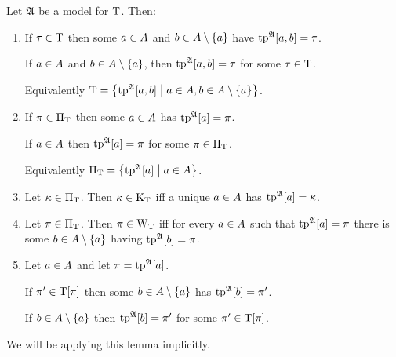 \begin{lemma}\label{rem:type-char}
Let $\mathfrak{A}$ be a model for $\mathrm{T}$.
Then:
\begin{enumerate}
  \item
  If $\tau\in\mathrm{T}$
  then some $a\in A$ and $b\in A\setminus\left\{a\right\}$
  have $\operatorname{tp}^{\mathfrak{A}}[a,b] = \tau$.
  
  If $a\in A$ and $b\in A\setminus\left\{a\right\}$,
  then $\operatorname{tp}^{\mathfrak{A}}[a,b] = \tau$ for some $\tau\in\mathrm{T}$.
  
  Equivalently $\mathrm{T} =
  \left\{\operatorname{tp}^{\mathfrak{A}}[a,b]\mathrel{}\middle|\mathrel{}a\in A,b\in A\setminus\left\{a\right\}\right\}$.
  \item
  If $\pi\in{\Pi}_{\mathrm{T}}$
  then some $a\in A$ has $\operatorname{tp}^{\mathfrak{A}}[a] = \pi$.
  
  If $a\in A$
  then $\operatorname{tp}^{\mathfrak{A}}[a] = \pi$ for some $\pi\in{\Pi}_{\mathrm{T}}$.
  
  Equivalently ${\Pi}_{\mathrm{T}} = \left\{\operatorname{tp}^{\mathfrak{A}}[a]\mathrel{}\middle|\mathrel{}a\in A\right\}$.
  \item
  Let $\kappa\in{\Pi}_{\mathrm{T}}$.
  Then $\kappa\in{\mathrm{K}}_{\mathrm{T}}$ iff a unique $a\in A$ has $\operatorname{tp}^{\mathfrak{A}}[a] = \kappa$.
  
  \item
  Let $\pi\in{\Pi}_{\mathrm{T}}$.
  Then $\pi\in{\mathrm{W}}_{\mathrm{T}}$ iff for every $a\in A$ such that $\operatorname{tp}^{\mathfrak{A}}[a] =
  \pi$ there is some $b\in A\setminus\left\{a\right\}$ having $\operatorname{tp}^{\mathfrak{A}}[b] = \pi$.
  
  \item
  Let $a\in A$ and let $\pi = \operatorname{tp}^{\mathfrak{A}}[a]$.
  
  If ${\pi'} \in \mathrm{T}[\pi]$ then some $b\in A\setminus\left\{a\right\}$ has
  $\operatorname{tp}^{\mathfrak{A}}[b] = {\pi'}$.
  
  If $b\in A\setminus\left\{a\right\}$ then $\operatorname{tp}^{\mathfrak{A}}[b] = {\pi'}$ for some
  ${\pi'}\in\mathrm{T}[\pi]$.
\end{enumerate}
We will be applying this lemma implicitly.
\end{lemma}
